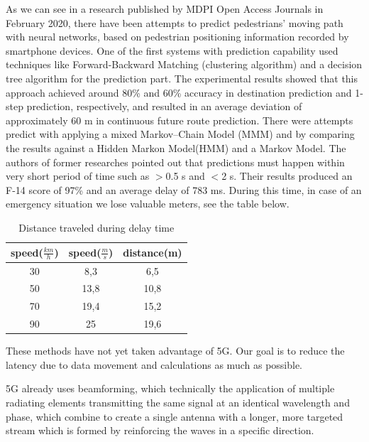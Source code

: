 \documentclass[conference]{IEEEtran}
\begin{document}
As we can see in a research published by MDPI Open Access Journals in February 2020, there have been attempts to predict pedestrians' moving path with neural networks, based on pedestrian positioning information recorded by smartphone devices. \cite{b1,b6} One of the first systems with prediction capability used techniques like Forward-Backward Matching (clustering algorithm) and a decision tree algorithm for the prediction part. The experimental results showed that this approach achieved around 80\% and
60\% accuracy in destination prediction and 1-step prediction, respectively, and resulted in an average deviation of approximately 60 m in continuous future route prediction. There were attempts predict with applying a mixed Markov–Chain Model (MMM) and by comparing the results against a Hidden Markon Model(HMM) and a Markov Model. The authors of former researches pointed out that predictions must happen within very short period of time such as $>$0.5 s and $<$2 s. Their results produced an
F-14 score of 97\% and an average delay of 783 ms. During this time, in case of an emergency situation we lose valuable meters, see the table below.
\begin{table}[h]
    \begin{center}
        \begin{tabular}{ |c|c|c| }
            \hline
            speed($\frac{km}{h}$) & speed($\frac{m}{s}$) & distance(m) \\
            \hline
            30                    & 8,3                  & 6,5         \\
            \hline
            50                    & 13,8                 & 10,8        \\
            \hline
            70                    & 19,4                 & 15,2        \\
            \hline
            90                    & 25                   & 19,6        \\
            \hline
        \end{tabular}
    \end{center}
    \caption{Distance traveled during delay time}
\end{table}

These methods have not yet taken advantage of 5G. Our goal is to reduce the latency due to data movement and calculations as much as possible.

5G already uses beamforming, which technically the application of multiple radiating elements transmitting the same signal at an identical wavelength and phase, which combine to create a single antenna with a longer, more targeted stream which is formed by reinforcing the waves in a specific direction. \cite{b3}
\end{document}
